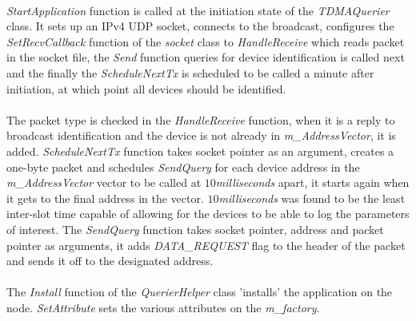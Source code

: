 \begin{centering}
\begin{figure}[h!]
    \end{figure}
\end{centering}\\
\textit{StartApplication} function is called at the initiation state of the
\textit{TDMAQuerier} class. It sets up an IPv4 UDP socket, connects to the broadcast,
configures the \textit{SetRecvCallback} function of the \textit{socket} class to
\textit{HandleReceive} which reads packet in the socket file, the \textit{Send}
function queries for device identification is called next and the finally the 
\textit{ScheduleNextTx} is scheduled to be called a minute after initiation, at which
point all devices should be identified.\\\\
The packet type is checked in the \textit{HandleReceive} function, when it is a reply
to broadcast identification and the device is not already in \textit{m\_AddressVector},
it is added. \textit{ScheduleNextTx} function takes socket pointer as an argument,
creates a one-byte packet and schedules \textit{SendQuery} for each device address
in the \textit{m\_AddressVector} vector to be called at $10$\textit{milliseconds}
apart, it starts again when it gets to the final address in the vector.
$10$\textit{milliseconds} was found to be the least inter-slot time capable of
allowing for the devices to be able to log the parameters of interest. The 
\textit{SendQuery} function takes socket pointer, address and packet pointer as
arguments, it adds \textit{DATA\_REQUEST} flag to the header of the packet and sends
it off to the designated address.\\\\
The \textit{Install} function of the \textit{QuerierHelper} class 'installs' the
application on the node. \textit{SetAttribute} sets the various attributes on the
\textit{m\_factory}.

